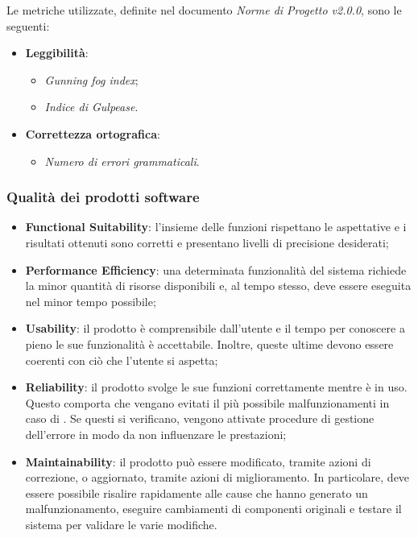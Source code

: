 Le metriche utilizzate, definite nel documento \emph{Norme di Progetto v2.0.0}, sono le seguenti:

\begin{itemize}
	\item{\textbf{Leggibilità}:
		\begin{itemize}
			\item{\emph{Gunning fog index};}
			\item{\emph{Indice di Gulpease}.}
		\end{itemize}	
	}
	\item{\textbf{Correttezza ortografica}:
		\begin{itemize}
			\item{\emph{Numero di errori grammaticali}.}
		\end{itemize}	
	}
\end{itemize}

\subsubsection{Qualità dei prodotti software}

\begin{itemize}
	\item{\textbf{Functional Suitability}: l'insieme delle funzioni rispettano le aspettative e i risultati ottenuti sono corretti e presentano livelli di precisione desiderati;
	}
	\item{\textbf{Performance Efficiency}: una determinata funzionalità del sistema richiede la minor quantità di risorse disponibili e, al tempo stesso, deve essere eseguita nel minor tempo possibile; 
	}
	\item{\textbf{Usability}: il prodotto è comprensibile dall'utente e il tempo per conoscere a pieno le sue funzionalità è accettabile. Inoltre, queste ultime devono essere coerenti con ciò che l'utente si aspetta;
	}
	\item{\textbf{Reliability}: il prodotto svolge le sue funzioni correttamente mentre è in uso. Questo comporta che vengano evitati il più possibile malfunzionamenti in caso di . Se questi si verificano, vengono attivate procedure di gestione dell'errore in modo da non influenzare le prestazioni;
	}
	\item{\textbf{Maintainability}: il prodotto può essere modificato, tramite azioni di correzione, o aggiornato, tramite azioni di miglioramento. In particolare, deve essere possibile risalire rapidamente alle cause che hanno generato un malfunzionamento, eseguire cambiamenti di componenti originali e testare il sistema per validare le varie modifiche.
	}
\end{itemize}

